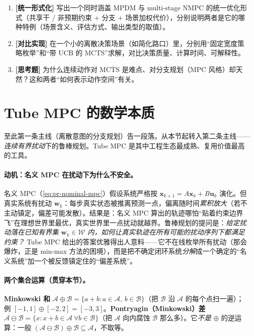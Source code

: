 \begin{practice}
\begin{enumerate}
  \item \textbf{[统一形式化]} 写出一个同时涵盖 MPDM 与 multi-stage NMPC 的统一优化形式（共享干 / 非预期约束 + 分支 + 场景加权代价），分别说明两者是它的哪种特例（场景含义、评估方式、输出类型的取值）。
  \item \textbf{[对比实现]} 在一个小的离散决策场景（如简化路口）里，分别用“固定宽度策略枚举”和“带 UCB 的 MCTS”求解，对比决策质量、计算时间、可解释性。
  \item \textbf{[思考题]} 为什么连续动作对 MCTS 是难点、对分支规划（MPC 风格）却天然？这和两者“如何表示动作空间”有关。
\end{enumerate}
\end{practice}

\section{Tube MPC 的数学本质}
\label{sec:pr-tube}

至此第一条主线（离散意图的分支规划）告一段落。从本节起转入第二条主线——\emph{连续有界扰动}下的鲁棒规划。Tube MPC 是其中工程生态最成熟、复用价值最高的工具。

\paragraph{动机：名义 MPC 在扰动下为什么不安全。}
名义 MPC（\cref{eq:pr-nominal-mpc}）假设系统严格按 $\mathbf{x}_{k+1}=A\mathbf{x}_k+B\mathbf{u}_k$ 演化。但真实系统有扰动 $\mathbf{w}_k$：每步真实状态被推离预测一点，偏离随时间\emph{累积放大}（若不主动镇定，偏差可能发散）。结果是：名义 MPC 算出的轨迹哪怕“贴着约束边界飞”在理想世界里最优，真实世界里一点扰动就越界。鲁棒规划的提问是：\emph{给定扰动落在已知有界集 $\mathbf{w}_k\in\mathcal{W}$ 内，如何让真实轨迹在所有可能的扰动序列下都满足约束？} Tube MPC 给出的答案优雅得出人意料——它不在线枚举所有扰动（那会爆炸，正是 min-max 方法的困境），而是把不确定闭环系统\emph{分解}成一个确定的“名义系统”加一个被反馈镇定住的“偏差系统”\cite{mayne2005tube}。

\paragraph{两个集合运算（贯穿本节）。}
\begin{definition}\label{def:pr-minkowski}
\textbf{Minkowski 和} $\mathcal{A}\oplus\mathcal{B}=\{a+b:a\in\mathcal{A},\,b\in\mathcal{B}\}$（把 $\mathcal{B}$ 沿 $\mathcal{A}$ 的每个点扫一遍）；例 $[-1,1]\oplus[-2,2]=[-3,3]$。\textbf{Pontryagin（Minkowski）差} $\mathcal{A}\ominus\mathcal{B}=\{x:x+b\in\mathcal{A}\ \forall b\in\mathcal{B}\}$（把 $\mathcal{A}$ 向内腐蚀 $\mathcal{B}$ 那么多）。它\emph{不是} $\oplus$ 的逆运算：一般 $(\mathcal{A}\ominus\mathcal{B})\oplus\mathcal{B}\subseteq\mathcal{A}$，不取等。
\end{definition}


